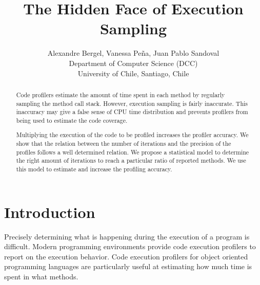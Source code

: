 \documentclass{sig-alternate}
\newcommand{\Title}{The Hidden Face of Execution Sampling}
\newcommand{\TitleShort}{\Title}
\newcommand{\Authors}{Alexandre Bergel, Vanessa Pe\~na, Juan Pablo Sandoval}
\newcommand{\AuthorsShort}{A. Bergel, V. Pe\~na, J.P. Sandoval}
\newcommand{\seclabel}[1]{\label{sec:#1}}
\begin{document}
\title{\Title}

\author{\Authors\\[3mm]
Department of Computer Science (DCC)\\ University of Chile, Santiago, Chile\\[1 ex]
} 

\maketitle


\begin{abstract}
Code profilers estimate the amount of time spent in each method by regularly sampling the method call stack. 
However, execution sampling is fairly inaccurate.
This inaccuracy may give a false sense of CPU time distribution and prevents profilers from being used to estimate the code coverage.

Multiplying the execution of the code to be profiled increases the profiler accuracy.
We show that the relation between the number of iterations and the precision of the profiles follows a well determined relation.
We propose a statistical model to determine the right amount of iterations to reach a particular ratio of reported methods. We use this model to estimate and increase the profiling accuracy.
\end{abstract}

\section{Introduction}\seclabel{introduction}

Precisely determining what is happening during the execution of a program is difficult. Modern programming environments provide code execution profilers to report on the execution behavior. Code execution profilers for object oriented programming languages are particularly useful at estimating how much time is spent in what methods.
\end{document}
